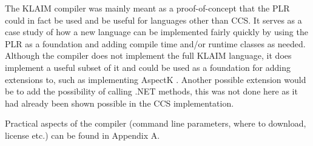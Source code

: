 	The KLAIM compiler was mainly meant as a proof-of-concept that the PLR could 
	in fact be used and be useful for languages other than CCS. It serves as a 
	case study of how a new language can be implemented fairly quickly by using 
	the PLR as a foundation and adding compile time and/or runtime classes as 
	needed. Although the compiler does not implement the full KLAIM language, it 
	does implement a useful subset of it and could be used as a foundation for 
	adding extensions to, such as implementing AspectK \cite{aspectk}. Another 
	possible extension would be to add the possibility of calling .NET methods, 
	this was not done here as it had already been shown possible in the CCS 
	implementation.
	
	Practical aspects of the compiler (command line parameters, where to 
	download, license etc.) can be found in Appendix A.
